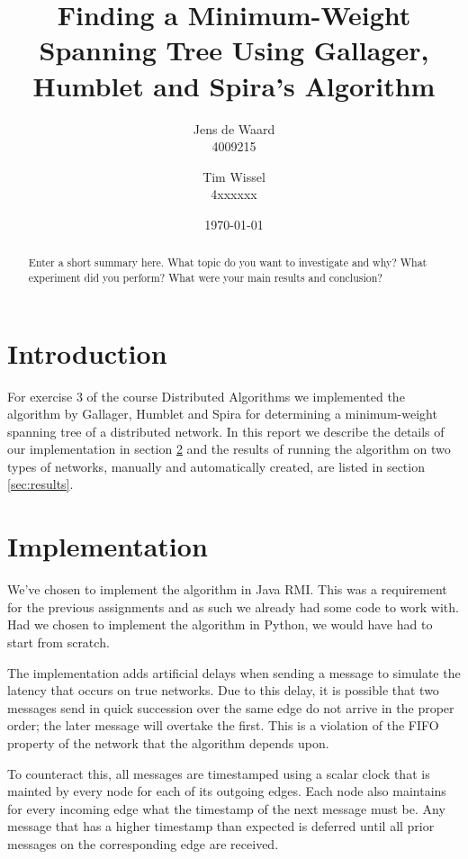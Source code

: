 \documentclass[a4paper]{article}
\title{Finding a Minimum-Weight Spanning Tree Using Gallager, Humblet and Spira's Algorithm}
\author{Jens de Waard \\ 4009215 \and Tim Wissel \\ 4xxxxxx}
\date{\today}
\begin{document}
\maketitle
\begin{abstract}
Enter a short summary here. What topic do you want to investigate and why?
What experiment did you perform? What were your main results and
conclusion?
\end{abstract}

\section{Introduction}
\label{sec:introduction}
For exercise 3 of the course Distributed Algorithms we implemented the
algorithm by Gallager, Humblet and Spira for determining a minimum-weight
spanning tree of a distributed network. In this report we describe the
details of our implementation in section \ref{sec:implementation} and the
results of running the algorithm on two types of networks, manually and
automatically created, are listed in section \ref{sec:results}.

\section{Implementation}
\label{sec:implementation}
We've chosen to implement the algorithm in Java RMI. This was a requirement for
the previous assignments and as such we already had some code to work with. Had
we chosen to implement the algorithm in Python, we would have had to start from
scratch.

The implementation adds artificial delays when sending a message to simulate
the latency that occurs on true networks. Due to this delay, it is possible
that two messages send in quick succession over the same edge do not arrive in
the proper order; the later message will overtake the first. This is a
violation of the FIFO property of the network that the algorithm depends upon.

To counteract this, all messages are timestamped using a scalar clock that is
mainted by every node for each of its outgoing edges. Each node also maintains
for every incoming edge what the timestamp of the next message must be. Any
message that has a higher timestamp than expected is deferred until all prior
messages on the corresponding edge are received.
\end{document}
